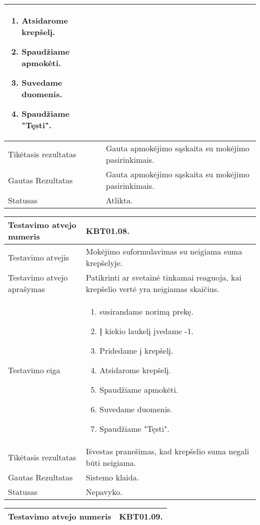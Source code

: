 \documentclass{VUMIFPSkursinis}
\begin{document}
\begin{center}
\begin{tabular}{ |p{5cm}|p{10cm}|}
\begin{enumerate}
		\item Atsidarome krepšelį.
		\item Spaudžiame apmokėti.
		\item Suvedame duomenis.
		\item Spaudžiame "Tęsti".
	\end{enumerate} \\ \hline
	Tikėtasis rezultatas & Gauta apmokėjimo sąskaita su mokėjimo pasirinkimais. \\ \hline
	Gautas Rezultatas & Gauta apmokėjimo sąskaita su mokėjimo pasirinkimais. \\ \hline
	Statusas & Atlikta. \\ \hline
	\end{tabular}
\vspace{1cm}
\begin{tabular}{ |p{5cm}|p{10cm}|}
	\hline
	Testavimo atvejo numeris & KBT01.08. \\ \hline
	Testavimo atvejis & Mokėjimo suformulavimas su neigiama suma krepšelyje. \\ \hline
	Testavimo atvejo aprašymas & Patikrinti ar svetainė tinkamai reaguoja, kai krepšelio vertė yra neigiamas skaičius. \\ \hline
	Testavimo eiga & 
	\begin{enumerate}
	\item susirandame norimą prekę.
	\item Į kiekio laukelį įvedame -1.
	\item Pridedame į krepšelį.
	\item Atsidarome krepšelį.
	\item Spaudžiame apmokėti.
	\item Suvedame duomenis.
	\item Spaudžiame "Tęsti".
\end{enumerate} \\ \hline
	Tikėtasis rezultatas & Išvestas pranešimas, kad krepšelio suma negali būti neigiama. \\ \hline
	Gautas Rezultatas & Sistemo klaida. \\ \hline
	Statusas & Nepavyko. \\ \hline
	\end{tabular}
\vspace{1cm}
\begin{tabular}{ |p{5cm}|p{10cm}|}
	\hline
	Testavimo atvejo numeris & KBT01.09. \\ \hline

\end{tabular}
\end{center}
\end{document}
